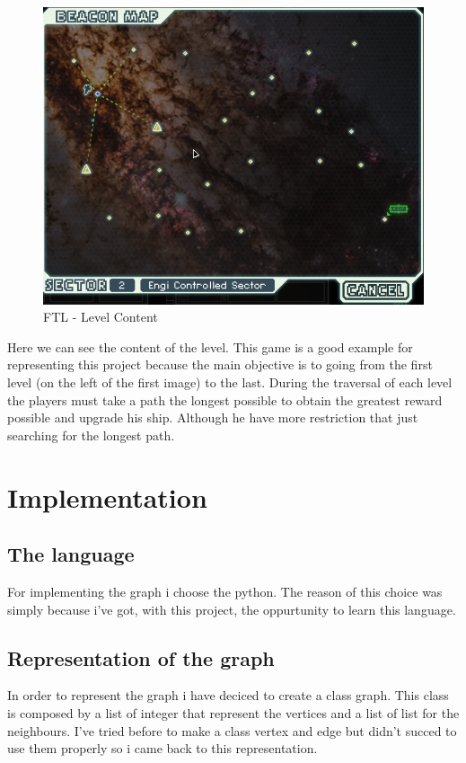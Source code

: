 \documentclass[a4paper,8pt]{article}
\begin{document}
\begin{figure}[h]
\centering
 \includegraphics[scale=0.3]{ftl-level.png}
\caption{FTL - Level Content}
\end{figure}
Here we can see the content of the level. This game is a good example for representing this project because the main objective is to going from the first level 
(on the left of the first image) to the last. During the traversal of each level the players must take a path the longest possible to obtain the greatest reward 
possible and upgrade his ship. Although he have more restriction that just searching for the longest path.
\section{Implementation}
\subsection{The language}
For implementing the graph i choose the python. The reason of this choice was simply because i've got, with this project, the oppurtunity to learn this language. 

\subsection{Representation of the graph}
In order to represent the graph i have deciced to create a class graph. This class is composed by a list of integer that represent the vertices and a list of list 
for the neighbours. I've tried before to make a class vertex and edge but didn't succed to use them properly so i came back to this representation.
\end{document}
